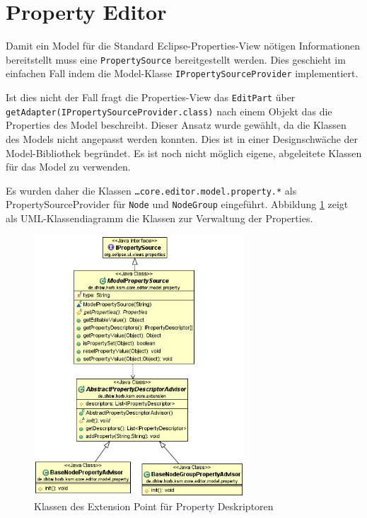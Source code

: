 \documentclass[%
12pt,titlepage,abstracton,DIV=10]{scrreprt}
\begin{document}
\section{Property Editor}
Damit ein Model für die Standard Eclipse-Properties-View nötigen Informationen
bereitstellt muss eine \texttt{Prop\-erty\-Source} bereitgestellt werden. Dies geschieht im
einfachen Fall indem die Model-Klasse \texttt{IProp\-erty\-Source\-Provider} implementiert.

Ist dies nicht der Fall fragt die Properties-View das \texttt{EditPart} über
\texttt{getAdapter\-(IProp\-erty\-Source\-Provider.class)} nach einem Objekt das
die Properties des Model beschreibt. Dieser Ansatz wurde gewählt, da die
Klassen des Models nicht angepasst werden konnten. Dies ist in einer
Designschwäche der Model-Bibliothek begründet. Es ist noch nicht möglich eigene,
abgeleitete Klassen für das Model zu verwenden.

Es wurden daher die Klassen \texttt{\ldots core.\-editor.\-model.\-property.*}
als PropertySourceProvider für \texttt{Node} und \texttt{NodeGroup} eingeführt.
Abbildung \ref{fig:ext-property-descriptors} zeigt als UML-Klassendiagramm die
Klassen zur Verwaltung der Properties.

\begin{figure}[mt]
\centering
\includegraphics[width=0.7\textwidth]{images/ext-property-descriptors.PNG}
\caption{Klassen des Extension Point für Property Deskriptoren}
\label{fig:ext-property-descriptors}
\end{figure}
\end{document}
